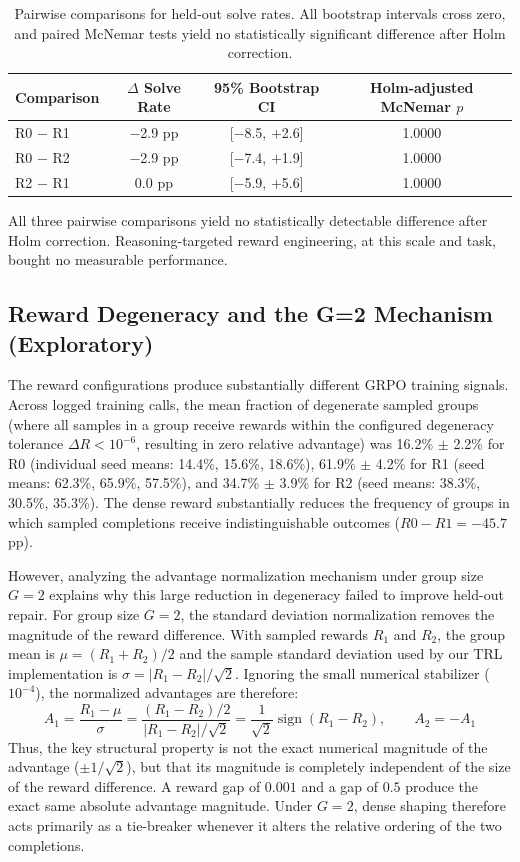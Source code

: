 \documentclass{article}
\begin{document}
\begin{table}[h]
\centering
\small
\begin{tabular}{l c c c}
\toprule
\textbf{Comparison} & \textbf{$\Delta$ Solve Rate} & \textbf{95\% Bootstrap CI} & \textbf{Holm-adjusted McNemar $p$} \\
\midrule
R0 $-$ R1 & $-$2.9 pp & [$-$8.5, $+$2.6] & 1.0000 \\
R0 $-$ R2 & $-$2.9 pp & [$-$7.4, $+$1.9] & 1.0000 \\
R2 $-$ R1 & 0.0 pp & [$-$5.9, $+$5.6] & 1.0000 \\
\bottomrule
\end{tabular}
\caption{Pairwise comparisons for held-out solve rates. All bootstrap intervals cross zero, and paired McNemar tests yield no statistically significant difference after Holm correction.}
\label{tab:pairwise}
\end{table}

All three pairwise comparisons yield no statistically detectable difference after Holm correction. Reasoning-targeted reward engineering, at this scale and task, bought no measurable performance.

\subsection{Reward Degeneracy and the G=2 Mechanism (Exploratory)}
The reward configurations produce substantially different GRPO training signals. Across logged training calls, the mean fraction of degenerate sampled groups (where all samples in a group receive rewards within the configured degeneracy tolerance $\Delta R < 10^{-6}$, resulting in zero relative advantage) was 16.2\% $\pm$ 2.2\% for R0 (individual seed means: 14.4\%, 15.6\%, 18.6\%), 61.9\% $\pm$ 4.2\% for R1 (seed means: 62.3\%, 65.9\%, 57.5\%), and 34.7\% $\pm$ 3.9\% for R2 (seed means: 38.3\%, 30.5\%, 35.3\%). The dense reward substantially reduces the frequency of groups in which sampled completions receive indistinguishable outcomes ($R0 - R1 = -45.7$ pp).

However, analyzing the advantage normalization mechanism under group size $G=2$ explains why this large reduction in degeneracy failed to improve held-out repair. For group size $G=2$, the standard deviation normalization removes the magnitude of the reward difference. With sampled rewards $R_1$ and $R_2$, the group mean is $\mu=(R_1+R_2)/2$ and the sample standard deviation used by our TRL implementation is $\sigma=|R_1-R_2|/\sqrt{2}$. Ignoring the small numerical stabilizer ($10^{-4}$), the normalized advantages are therefore:
\begin{equation}
A_1 = \frac{R_1-\mu}{\sigma} = \frac{(R_1-R_2)/2}{|R_1-R_2|/\sqrt{2}} = \frac{1}{\sqrt{2}}\operatorname{sign}(R_1-R_2), \qquad A_2 = -A_1
\end{equation}
Thus, the key structural property is not the exact numerical magnitude of the advantage ($\pm 1/\sqrt{2}$), but that its magnitude is completely independent of the size of the reward difference. A reward gap of $0.001$ and a gap of $0.5$ produce the exact same absolute advantage magnitude. Under $G=2$, dense shaping therefore acts primarily as a tie-breaker whenever it alters the relative ordering of the two completions.
\end{document}
